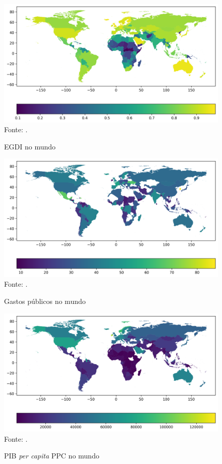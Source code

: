 \begin{figure}[H]
	\centering
	\caption{EGDI no mundo}
	\includegraphics[width=1\linewidth]{figuras/egdi/mapa_coropleto_paises_egdi}
	\label{fig:mapa_coropleto_paises_egdi}
	\footnotesize{Fonte: \cite{ONU_EGDI_mapa}.}
\end{figure}

\begin{figure}[H]
	\centering
	\caption{Gastos públicos no mundo}
	\includegraphics[width=1\linewidth]{figuras/government_spending/mapa_coropleto_paises_gastospublicos}
	\label{fig:mapa_coropleto_paises_gastospublicos}
	\footnotesize{Fonte: \cite{FMI_gov_expenditure}.}
\end{figure}

\begin{figure}[H]
	\centering
	\caption{PIB \textit{per capita} PPC no mundo}
	\includegraphics[width=1\linewidth]{figuras/pib/mapa_coropleto_paises_pib_percapita_ppc}
	\label{fig:mapa_coropleto_paises_pib_percapita_ppc}
	\footnotesize{Fonte: \cite{WB_pib_per_capita_países}.}
\end{figure}


